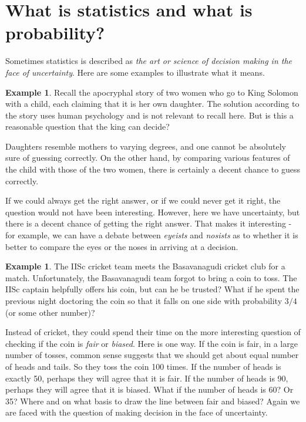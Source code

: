\documentclass[preprint,  11pt]{amsart}
\theoremstyle{plain} %
\theoremstyle{definition} %
\newtheorem{example}[theorem]{Example}
\begin{document}
\section{What is statistics and what is probability?}
Sometimes statistics is described as {\em the art or science of decision making in the face of uncertainty}.  Here are some examples to illustrate what it means.
\begin{example}Recall the apocryphal story of two women who go to King Solomon with a child, each claiming that it is her own daughter. The solution according to the story uses human psychology and is not relevant to recall here. But is this a reasonable question that the king can decide? 

Daughters resemble mothers to varying degrees, and one cannot be absolutely sure of guessing correctly.  
 On the other hand, by comparing various features of the child with those of the two women, there is certainly a decent chance to guess correctly.
   
  If we could always get the right answer, or if we could never get it right, the question would not have been interesting. However, here we have uncertainty, but there is a decent chance of getting the right answer. That makes it interesting - for example, we can have a debate between {\em eyeists}  and {\em nosists} as to whether it is better to compare the eyes or the noses in arriving at a decision.
\end{example}
\begin{example}The IISc cricket team meets the Basavanagudi cricket club for a match. Unfortunately, the Basavanagudi team forgot to bring a coin to toss. The IISc captain helpfully offers his coin, but can he be trusted? What if he spent the previous night doctoring the coin so that it falls on one side with probability $3/4$ (or some other number)? 

Instead of cricket, they could spend their time on the more interesting question of checking if the coin is {\em fair} or {\em biased}. Here is one way. If the coin is fair, in a large number of tosses, common sense suggests that we should get about equal number of heads and tails. So they  toss the coin 100 times. If the number of heads is exactly 50, perhaps they will agree that it is fair. If the number of heads is 90, perhaps they will agree that it is biased. What if the number of heads is 60? Or 35? Where and on what basis to draw the line between fair and biased? Again we are faced with the question of making decision in the face of uncertainty.
\end{example}
\end{document}
